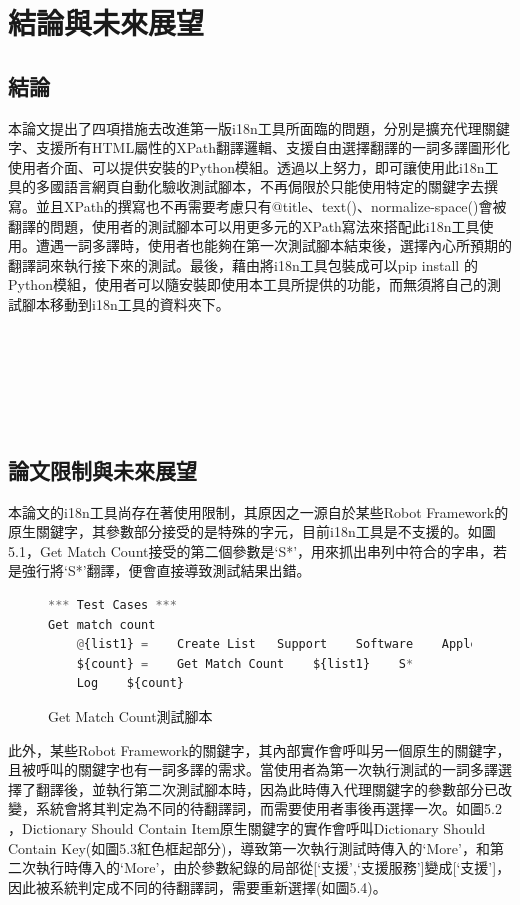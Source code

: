 \chapter{結論與未來展望}

\section{結論}
本論文提出了四項措施去改進第一版i18n工具所面臨的問題，分別是擴充代理關鍵字、支援所有HTML屬性的XPath翻譯邏輯、支援自由選擇翻譯的一詞多譯圖形化使用者介面、可以提供安裝的Python模組。透過以上努力，即可讓使用此i18n工具的多國語言網頁自動化驗收測試腳本，不再侷限於只能使用特定的關鍵字去撰寫。並且XPath的撰寫也不再需要考慮只有@title、text()、normalize-space()會被翻譯的問題，使用者的測試腳本可以用更多元的XPath寫法來搭配此i18n工具使用。遭遇一詞多譯時，使用者也能夠在第一次測試腳本結束後，選擇內心所預期的翻譯詞來執行接下來的測試。最後，藉由將i18n工具包裝成可以pip install 的Python模組，使用者可以隨安裝即使用本工具所提供的功能，而無須將自己的測試腳本移動到i18n工具的資料夾下。

\hspace*{\fill} \\
\\ \hspace*{\fill} \\
\\ \hspace*{\fill} \\
\section{論文限制與未來展望}
本論文的i18n工具尚存在著使用限制，其原因之一源自於某些Robot Framework的原生關鍵字，其參數部分接受的是特殊的字元，目前i18n工具是不支援的。如圖5.1，Get Match Count接受的第二個參數是‘S*’，用來抓出串列中符合的字串，若是強行將‘S*’翻譯，便會直接導致測試結果出錯。

\begin{figure}[H]
\centering
\begin{lstlisting}[language={python}]
*** Test Cases ***
Get match count
    @{list1} =    Create List   Support    Software    Apple
    ${count} =    Get Match Count    ${list1}    S*
    Log    ${count} 
\end{lstlisting}
\caption{Get Match Count測試腳本}
\end{figure}

此外，某些Robot Framework的關鍵字，其內部實作會呼叫另一個原生的關鍵字，且被呼叫的關鍵字也有一詞多譯的需求。當使用者為第一次執行測試的一詞多譯選擇了翻譯後，並執行第二次測試腳本時，因為此時傳入代理關鍵字的參數部分已改變，系統會將其判定為不同的待翻譯詞，而需要使用者事後再選擇一次。如圖5.2 ，Dictionary Should Contain Item原生關鍵字的實作會呼叫Dictionary Should Contain Key(如圖5.3紅色框起部分)，導致第一次執行測試時傳入的‘More’，和第二次執行時傳入的‘More’，由於參數紀錄的局部從[‘支援’,‘支援服務’]變成[‘支援’]，因此被系統判定成不同的待翻譯詞，需要重新選擇(如圖5.4)。\\

